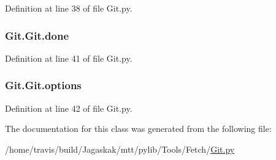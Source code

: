 Definition at line 38 of file Git.\-py.

\hypertarget{classGit_1_1Git_adb8991008d4bb4568fa9c2f991711cda}{
\subsubsection[{done}]{\setlength{\rightskip}{0pt plus 5cm}Git.\-Git.\-done}}\label{classGit_1_1Git_adb8991008d4bb4568fa9c2f991711cda}


Definition at line 41 of file Git.\-py.

\hypertarget{classGit_1_1Git_a7560b88b014c5da8785739c7bb6283ed}{
\subsubsection[{options}]{\setlength{\rightskip}{0pt plus 5cm}Git.\-Git.\-options}}\label{classGit_1_1Git_a7560b88b014c5da8785739c7bb6283ed}


Definition at line 42 of file Git.\-py.



The documentation for this class was generated from the following file\-:\begin{DoxyCompactItemize}
\item 
/home/travis/build/\-Jagaskak/mtt/pylib/\-Tools/\-Fetch/\hyperlink{Git_8py}{Git.\-py}\end{DoxyCompactItemize}
